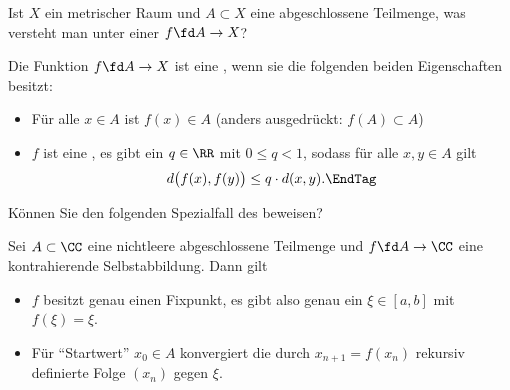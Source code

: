 \begin{frage}
  Ist $X$ ein metrischer Raum und $A\subset X$ eine abgeschlossene 
  Teilmenge, was versteht man unter einer 
   $f\fd A\to X$?
\end{frage}

\begin{antwort}
  
  Die Funktion 
  $f\fd A\to X$ ist eine , 
  wenn sie die folgenden beiden Eigenschaften besitzt:
  {\setlength{\labelsep}{4mm}
    \begin{itemize}
    \item[\desc{i}] Für alle $x\in A$ ist 
      $f(x) \in A$ (anders ausgedrückt: $f(A) \subset A$)\\[-3.5mm]
    \item[\desc{ii}] $f$ ist eine , {\dasheisst} es gibt 
      ein $q \in \RR$ mit $0\le q <1$, sodass  für alle $x,y\in A$ gilt
      \begin{equation}
        d\big( f(x), f(y) \big) \le q\cdot d(x,y) .
        \EndTag
      \end{equation}
    \end{itemize}}
\end{antwort}

\begin{frage}\label{06_banach}
  Können Sie den folgenden Spezialfall des 
   beweisen?

  \medskip
  \noindent
  Sei $A\subset \CC$ eine nichtleere abgeschlossene Teilmenge und 
  $f\fd A\to \CC$ eine kontrahierende Selbstabbildung. Dann gilt 
  {\setlength{\labelsep}{4mm}
    \begin{itemize}
    \item[\desc{a}] $f$ besitzt genau einen Fixpunkt, es gibt also genau 
      ein $\xi \in [a,b]$ mit $f(\xi)=\xi$.\\[-3.5mm]
    \item[\desc{b}] Für  "`Startwert"' $x_0 \in A$ konvergiert die 
      durch $x_{n+1}=f(x_n)$ rekursiv definierte Folge $(x_n)$ gegen $\xi$.
    \end{itemize}}
\end{frage}

